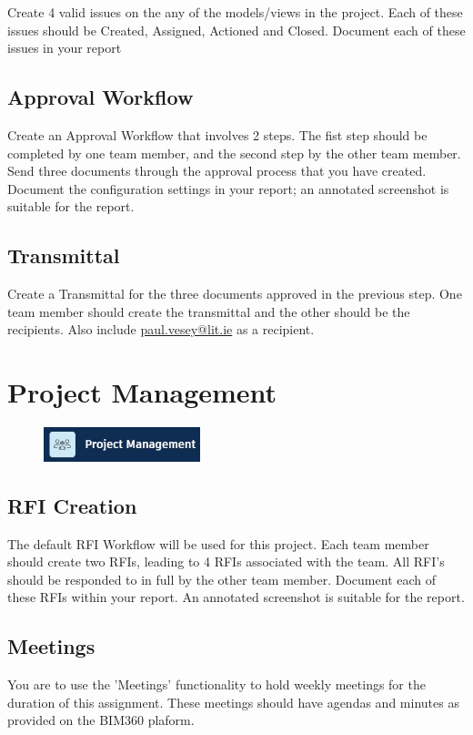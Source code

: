 Create 4 valid issues on the any of the models/views in the project.  Each of these issues should be Created, Assigned, Actioned and Closed.  Document each of these issues in your report

\subsection{Approval Workflow}

Create an Approval Workflow that involves 2 steps.  The fist step should be completed by one team member, and the second step by the other  team member.  Send three documents through the approval process that you have created.  Document the configuration settings in your report; an annotated screenshot is suitable for the report.

\subsection{Transmittal}

Create a Transmittal for the three documents approved in the previous step.  One team member should create the transmittal and the other should be the recipients.  Also include \href{mailto:paul.vesey@lit.ie}{paul.vesey@lit.ie} as a recipient.  


\section{Project Management}

\begin{figure}[h!t]
	\includegraphics[height=1.0cm]{RevitAssets/projmgmt}
	\label{fig:projmgmt}
\end{figure}



\subsection{RFI Creation}
The default RFI Workflow will be used for this project.  Each team member should create two RFIs, leading to 4 RFIs associated with the team.  All RFI's should be responded to in full by the other team member.  Document each of these RFIs within your report. An annotated screenshot is suitable for the report. 


\subsection{Meetings}
You are to use the 'Meetings' functionality to hold weekly meetings for the duration of this assignment.  These meetings should have agendas and minutes as provided on the BIM360 plaform.



